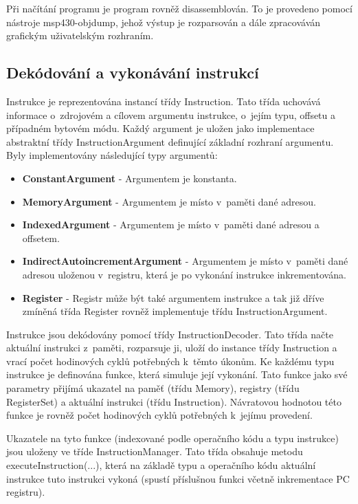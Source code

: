 Při načítání programu je program rovněž disassemblován. To je provedeno pomocí nástroje msp430-objdump, jehož výstup je rozparsován a dále zpracováván grafickým uživatelským rozhraním.

\subsection{Dekódování a vykonávání instrukcí}

Instrukce je reprezentována instancí třídy Instruction. Tato třída uchovává informace o~zdrojovém a cílovem argumentu instrukce, o~jejím typu, offsetu a případném bytovém módu. Každý argument je uložen jako implementace abstraktní třídy InstructionArgument definující základní rozhraní argumentu. Byly implementovány následující typy argumentů:

\begin{itemize}
\item \textbf{ConstantArgument} - Argumentem je konstanta.
\item \textbf{MemoryArgument} - Argumentem je místo v~paměti dané adresou.
\item \textbf{IndexedArgument} - Argumentem je místo v~paměti dané adresou a offsetem.
\item \textbf{IndirectAutoincrementArgument} - Argumentem je místo v~paměti dané adresou uloženou v~registru, která je po vykonání instrukce inkrementována.
\item \textbf{Register} - Registr může být také argumentem instrukce a tak již dříve zmíněná třída Register rovněž implementuje třídu InstructionArgument.
\end{itemize}

Instrukce jsou dekódovány pomocí třídy InstructionDecoder. Tato třída načte aktuální instrukci z~paměti, rozparsuje ji, uloží do instance třídy Instruction a vrací počet hodinových cyklů potřebných k~těmto úkonům. Ke každému typu instrukce je definována funkce, která simuluje její vykonání. Tato funkce jako své parametry přijímá ukazatel na paměť (třídu Memory), registry (třídu RegisterSet) a aktuální instrukci (třídu Instruction). Návratovou hodnotou této funkce je rovněž počet hodinových cyklů potřebných k~jejímu provedení.

Ukazatele na tyto funkce (indexované podle operačního kódu a typu instrukce) jsou uloženy ve tříde InstructionManager. Tato třída obsahuje metodu executeInstruction(...), která na základě typu a operačního kódu aktuální instrukce tuto instrukci vykoná (spustí příslušnou funkci včetně inkrementace PC registru).

